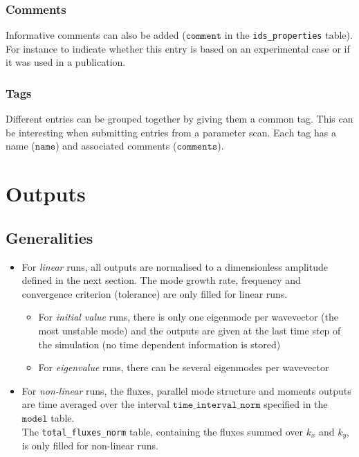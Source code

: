 \documentclass[a4paper]{report}
\begin{document}
\subsection{Comments} \label{sec:comments}
Informative comments can also be added  ($\texttt{comment}$ in the \texttt{ids\_properties} table). For instance to indicate whether this entry is based on an experimental case or if it was used in a publication.

\subsection{Tags} \label{sec:tags}
Different entries can be grouped together by giving them a common tag. This can be interesting when submitting entries from a parameter scan. Each tag has a name ($\texttt{name}$) and associated comments ($\texttt{comments}$).
 

\chapter{Outputs}

\section{Generalities}
\begin{itemize}
 \item For \textit{linear} runs, all outputs are normalised to a dimensionless amplitude defined in the next section.  The mode growth rate, frequency and convergence criterion (tolerance) are only filled for linear runs.
  \begin{itemize}
   \item For \textit{initial value} runs, there is only one eigenmode per wavevector (the most unstable mode) and the outputs are given at the last time step of the simulation (no time dependent information is stored)
   \item For \textit{eigenvalue} runs, there can be several eigenmodes per wavevector
  \end{itemize}	  
 \item For \textit{non-linear} runs, the fluxes, parallel mode structure and moments outputs are time averaged over the interval $\texttt{time\_interval\_norm}$ specified in the $\texttt{model}$ table.\\ 
 The \texttt{total\_fluxes\_norm} table, containing the fluxes summed over $k_x$ and $k_y$, is only filled for non-linear runs.
\end{itemize}
\end{document}
